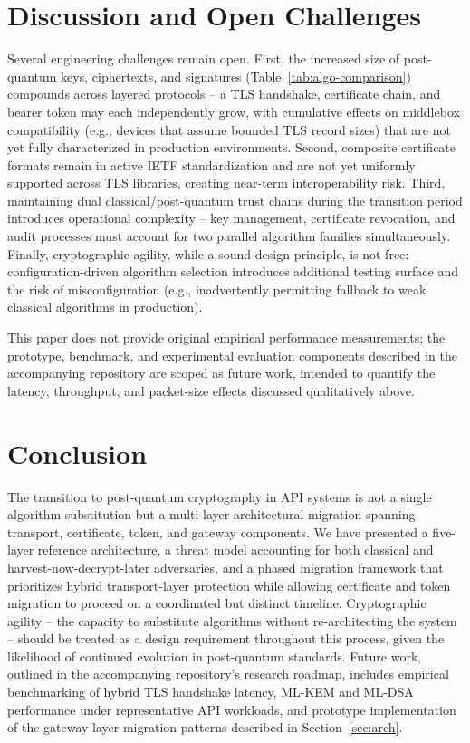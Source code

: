 \documentclass[conference]{IEEEtran}
\begin{document}
\section{Discussion and Open Challenges}

Several engineering challenges remain open. First, the increased size of
post-quantum keys, ciphertexts, and signatures (Table~\ref{tab:algo-comparison})
compounds across layered protocols -- a TLS handshake, certificate chain,
and bearer token may each independently grow, with cumulative effects on
middlebox compatibility (e.g., devices that assume bounded TLS record
sizes) that are not yet fully characterized in production environments.
Second, composite certificate formats remain in active IETF
standardization \cite{x509_pqc_draft} and are not yet uniformly supported
across TLS libraries, creating near-term interoperability risk. Third,
maintaining dual classical/post-quantum trust chains during the transition
period introduces operational complexity -- key management, certificate
revocation, and audit processes must account for two parallel algorithm
families simultaneously. Finally, cryptographic agility, while a sound
design principle, is not free: configuration-driven algorithm selection
introduces additional testing surface and the risk of misconfiguration
(e.g., inadvertently permitting fallback to weak classical algorithms in
production).

This paper does not provide original empirical performance measurements;
the prototype, benchmark, and experimental evaluation components described
in the accompanying repository are scoped as future work, intended to
quantify the latency, throughput, and packet-size effects discussed
qualitatively above.

\section{Conclusion}

The transition to post-quantum cryptography in API systems is not a single
algorithm substitution but a multi-layer architectural migration spanning
transport, certificate, token, and gateway components. We have presented a
five-layer reference architecture, a threat model accounting for both
classical and harvest-now-decrypt-later adversaries, and a phased migration
framework that prioritizes hybrid transport-layer protection while
allowing certificate and token migration to proceed on a coordinated but
distinct timeline. Cryptographic agility -- the capacity to substitute
algorithms without re-architecting the system -- should be treated as a
design requirement throughout this process, given the likelihood of
continued evolution in post-quantum standards. Future work, outlined in
the accompanying repository's research roadmap, includes empirical
benchmarking of hybrid TLS handshake latency, ML-KEM and ML-DSA performance
under representative API workloads, and prototype implementation of the
gateway-layer migration patterns described in Section~\ref{sec:arch}.
\end{document}
